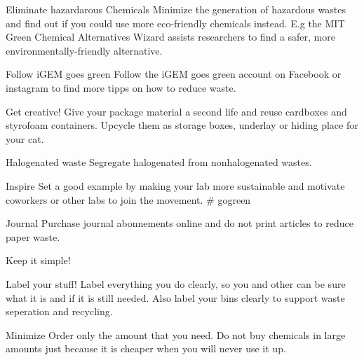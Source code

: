 \begin{suggest}{Eliminate hazardarous Chemicals}
	Minimize the generation of hazardous wastes and find out if you could use more eco-friendly chemicals instead. 
	E.g the MIT Green Chemical Alternatives Wizard assists researchers to find a safer, more environmentally-friendly alternative. 
\end{suggest}

\begin{suggest}{Follow iGEM goes green }
	Follow the iGEM goes green account on Facebook or instagram to find more tipps on how to reduce waste. 
\end{suggest}

\begin{suggest}{Get creative!}
	Give your package material a second life and reuse cardboxes and styrofoam containers. Upcycle them as storage boxes, underlay or hiding place for your cat.   
\end{suggest}

\begin{suggest}{Halogenated waste}
	Segregate halogenated from nonhalogenated wastes.
\end{suggest}

\begin{suggest}{Inspire}
	Set a good example by making your lab more sustainable and motivate coworkers or other labs to join the movement. \# gogreen
\end{suggest}

\begin{suggest}{Journal}
	Purchase journal abonnements online and do not print articles to reduce paper waste. 
\end{suggest}

\begin{suggest}{Keep it simple!}
	
\end{suggest}

\begin{suggest}{Label your stuff!}
	Label everything you do clearly, so you and other can be sure what it is and if it is still needed. 
	Also label your bins clearly to support waste seperation and recycling. 
\end{suggest}

\begin{suggest}{Minimize}
	Order only the amount that you need. Do not buy chemicals in large amounts just because it is cheaper when you will never use it up. 
\end{suggest}


